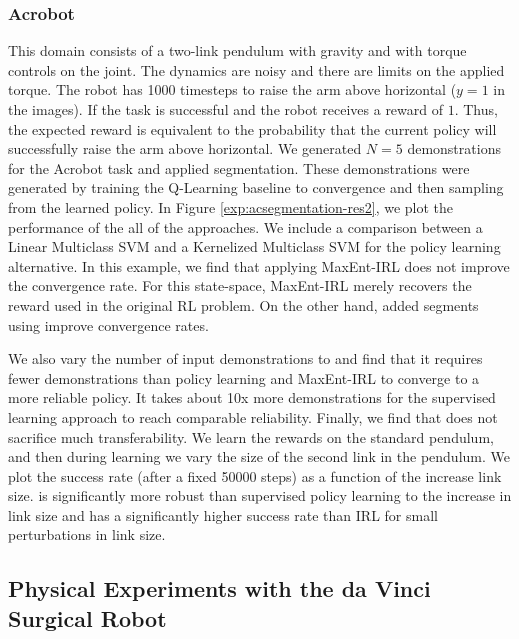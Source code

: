 \subsubsection{Acrobot}\label{exp:acrobot}
This domain consists of a two-link pendulum with gravity and with torque controls on the joint. The dynamics are noisy and there are limits on the applied torque. The robot has 1000 timesteps to raise the arm above horizontal ($y=1$ in the images). If the task is successful and the robot receives a reward of $1$. 
Thus, the expected reward is equivalent to the probability that the current policy will successfully raise the arm above horizontal.
We generated $N=5$ demonstrations for the Acrobot task and applied segmentation. 
These demonstrations were generated by training the Q-Learning baseline to convergence and then sampling from the learned policy.
In Figure \ref{exp:acsegmentation-res2}, we plot the performance of the all of the approaches.
We include a comparison between a Linear Multiclass SVM and a Kernelized Multiclass SVM for the policy learning alternative.
In this example, we find that applying MaxEnt-IRL does not improve the convergence rate.
For this state-space, MaxEnt-IRL merely recovers the reward used in the original RL problem.
On the other hand, added segments using \hirl improve convergence rates.


We also vary the number of input demonstrations to \hirl and find that it requires fewer demonstrations than policy learning and MaxEnt-IRL to converge to a more reliable policy.
It takes about 10x more demonstrations for the supervised learning approach to reach comparable reliability.
Finally, we find that \hirl does not sacrifice much transferability.
We learn the rewards on the standard pendulum, and then during learning we vary the size of the second link in the pendulum.
We plot the success rate (after a fixed 50000 steps) as a function of the increase link size.
\hirl is significantly more robust than supervised policy learning to the increase in link size and has a significantly higher success rate than IRL for small perturbations in link size. 

\subsection{Physical Experiments with the da Vinci Surgical Robot}


